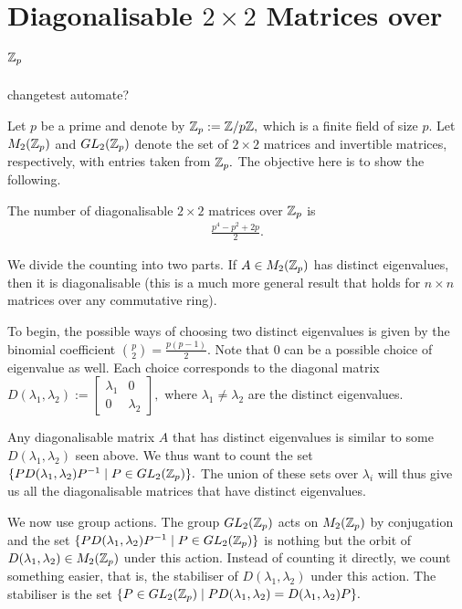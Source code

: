 \documentclass[11pt, titlepage, a4paper]{article}
\begin{document}
	\maketitle
	

	


\section{Diagonalisable $2\times 2$ Matrices over $\mathbb{Z}_{p}$ }

changetest automate?

Let $p$ be a prime and denote by $\mathbb{Z}_{p} := \mathbb{Z}/p\mathbb{Z},$ which is a finite field of size $p.$ Let $M_{2}(\mathbb{Z}_{p})$ and $GL_{2}(\mathbb{Z}_{p})$ denote the set of $2\times 2$ matrices and invertible matrices, respectively, with entries taken from $\mathbb{Z}_{p}.$  The objective here is to show the following.   

\begin{theorem}\label{count}
 The number of diagonalisable $2\times 2$ matrices over $\mathbb{Z}_{p}$ is 
 \begin{align*}
 \frac{p^4-p^{2}+2p}{2}.
\end{align*}

\end{theorem}

We divide the counting into two parts. If $A \in M_{2}(\mathbb{Z}_{p})$ has distinct eigenvalues, then it is diagonalisable (this is a much more general result that holds for $n\times n$ matrices over any commutative ring). 

To begin, the possible ways of choosing two distinct eigenvalues is given by the binomial coefficient $\binom{p}{2} = \frac{p(p-1)}{2}.$ Note that $0$ can be a possible choice of eigenvalue as well. Each choice corresponds to the diagonal matrix $D(\lambda_{1},\lambda_{2}) :=
\begin{bmatrix}
 \lambda_{1} & 0 \\
 0 & \lambda_{2}
\end{bmatrix},
$ where $\lambda_{1} \neq \lambda_{2}$ are the distinct eigenvalues. 

Any diagonalisable matrix $A$ that has distinct eigenvalues is similar to some $D(\lambda_{1},\lambda_{2})$ seen above. We thus want to count the set $\{ PD(\lambda_{1},\lambda_{2})P^{-1} \mid P \in GL_{2}(\mathbb{Z}_{p}) \}.$ The union of these sets over $\lambda_{i}$ will thus give us all the diagonalisable matrices that have distinct eigenvalues. 

We now use group actions. The group $GL_{2}(\mathbb{Z}_{p})$ acts on $M_{2}(\mathbb{Z}_{p})$ by conjugation and the set $\{ PD(\lambda_{1},\lambda_{2})P^{-1} \mid P \in GL_{2}(\mathbb{Z}_{p}) \}$ is nothing but the orbit of $D(\lambda_{1},\lambda_{2}) \in M_{2}(\mathbb{Z}_{p})$ under this action. Instead of counting it directly, we count something easier, that is, the stabiliser of $D(\lambda_{1},\lambda_{2})$ under this action. The stabiliser is the set $\{ P \in GL_{2}(\mathbb{Z}_{p}) \mid PD(\lambda_{1},\lambda_{2}) = D(\lambda_{1},\lambda_{2})P \}.$ 
\end{document}
